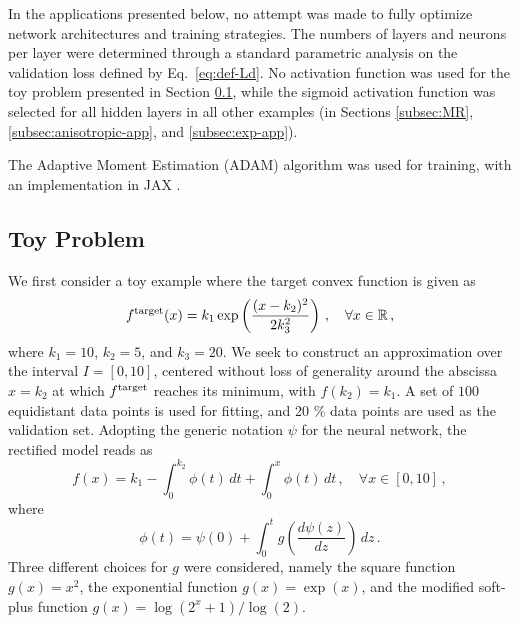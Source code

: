 In the applications presented below, no attempt was made to fully optimize network architectures and training strategies. The numbers of layers and neurons per layer were determined through a standard parametric analysis on the validation loss defined by Eq.~\eqref{eq:def-Ld}. No activation function was used for the toy problem presented in Section \ref{subsec:toy}, while the sigmoid activation function was selected for all hidden layers in all other examples (in Sections \ref{subsec:MR}, \ref{subsec:anisotropic-app}, and \ref{subsec:exp-app}). 

The Adaptive Moment Estimation (ADAM) algorithm was used for training, with an implementation in JAX \cite{jax2018github}. 

\subsection{Toy Problem}\label{subsec:toy}
We first consider a toy example where the target convex function is given as
\begin{align}
        f^\textnormal{target}(x) = k_1 \exp\left( \frac{(x - k_2)^2}{2k_3^2} \right)\,, \quad \forall x \in \mathbb{R}\,,
\end{align}
where $k_1= 10$, $k_2= 5$, and $k_3= 20$. We seek to construct an approximation over the interval $I = [0, 10]$, centered without loss of generality around the abscissa $x = k_2$ at which $f^\textnormal{target}$ reaches its minimum, with $f(k_2) = k_1$. A set of $100$ equidistant data points is used for fitting, and 20 \% data points are used as the validation set. Adopting the generic notation $\psi$ for the neural network, the rectified model reads as
\begin{equation}
    f(x) = k_1 - \int_{0}^{k_2} \phi(t) \,dt + \int_{0}^x \phi(t) \,dt\,, \quad \forall x \in [0, 10]\,,
\end{equation}
where
\begin{equation}
    \phi(t) = \psi(0) + \int_{0}^t g\left(\frac{d\psi(z)}{dz}\right) \,dz\,.
\end{equation}
Three different choices for $g$ were considered, namely the square function $g(x) = x^2$, the exponential function $g(x) = \exp(x)$, and the modified soft-plus function $g(x) = \log(2^x+1)/\log(2)$. 

